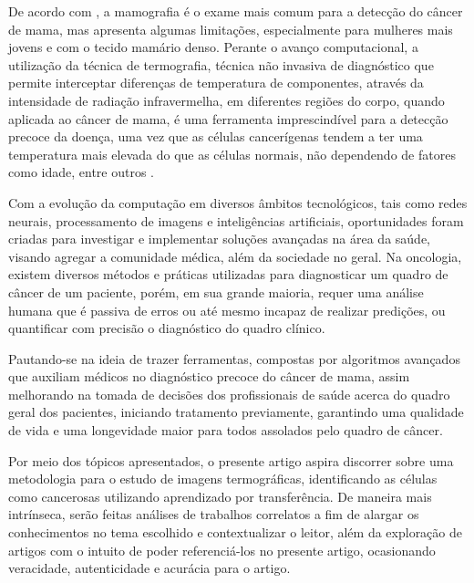 De acordo com , a mamografia é o exame mais comum para a detecção do câncer de mama, mas apresenta algumas limitações, especialmente para mulheres mais jovens e com o tecido mamário denso. Perante o avanço computacional, a utilização da técnica de termografia, técnica não invasiva de diagnóstico que permite interceptar diferenças de temperatura de componentes, através da intensidade de radiação infravermelha, em diferentes regiões do corpo, quando aplicada ao câncer de mama, é uma ferramenta imprescindível para a detecção precoce da doença, uma vez que as células cancerígenas tendem a ter uma temperatura mais elevada do que as células normais, não dependendo de fatores como idade, entre outros \cite{leles}.

Com a evolução da computação em diversos âmbitos tecnológicos, tais como redes neurais, processamento de imagens e inteligências artificiais, oportunidades foram criadas para investigar e implementar soluções avançadas na área da saúde, visando agregar a comunidade médica, além da sociedade no geral. Na oncologia, existem diversos métodos e práticas utilizadas para diagnosticar um quadro de câncer de um paciente, porém, em sua grande maioria, requer uma análise humana que é passiva de erros ou até mesmo incapaz de realizar predições, ou quantificar com precisão o diagnóstico do quadro clínico.

Pautando-se na ideia de trazer ferramentas, compostas por algoritmos avançados que auxiliam médicos no diagnóstico precoce do câncer de mama, assim melhorando na tomada de decisões dos profissionais de saúde acerca do quadro geral dos pacientes, iniciando tratamento previamente, garantindo uma qualidade de vida e uma longevidade maior para todos assolados pelo quadro de câncer.

Por meio dos tópicos apresentados, o presente artigo aspira discorrer sobre uma metodologia para o estudo de imagens termográficas, identificando as células como cancerosas utilizando aprendizado por transferência. De maneira mais intrínseca, serão feitas análises de trabalhos correlatos a fim de alargar os conhecimentos no tema escolhido e contextualizar o leitor, além da exploração de artigos com o intuito de poder referenciá-los no presente artigo, ocasionando veracidade, autenticidade e acurácia para o artigo.


